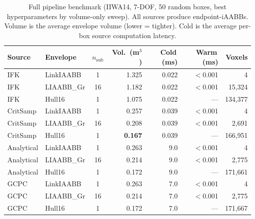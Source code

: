 \documentclass[journal]{IEEEtran}
\begin{document}
\begin{table}[t]
\centering
\caption{Full pipeline benchmark (IIWA14, 7-DOF, 50 random boxes,
best hyperparameters by volume-only sweep).
All sources produce endpoint-iAABBs.
Volume is the average envelope volume (lower = tighter).
Cold is the average per-box source computation latency.}
\label{tab:pipeline}
\setlength{\tabcolsep}{2.0pt}
\small
\begin{tabular}{@{}llcrrrr@{}}
\toprule
Source & Envelope & $n_\text{sub}$
  & \!\!Vol.\ (m$^3$)\!\! & \!Cold\,(ms)\! & \!Warm\,(ms)\! & Voxels \\
\midrule
IFK          & LinkIAABB   &  1 & 1.325 &   0.022 & $<$0.001 & 4 \\
IFK          & LIAABB\_Gr  & 16 & 1.182 &   0.022 &  $<$0.001 & 15{,}324 \\
IFK          & Hull16      &  1 & 1.075 &   0.022 &  --- & 134{,}377 \\
\midrule
CritSamp     & LinkIAABB   &  1 & 0.257 &   0.039 & $<$0.001 & 4 \\
CritSamp     & LIAABB\_Gr  & 16 & 0.208 &   0.039 &  $<$0.001 & 2{,}691 \\
CritSamp     & Hull16      &  1 & \textbf{0.167} &   0.039 &  --- & 166{,}951 \\
\midrule
Analytical   & LinkIAABB   &  1 & 0.263 &   9.0\phantom{00}  & $<$0.001 & 4 \\
Analytical   & LIAABB\_Gr  & 16 & 0.214 &   9.0\phantom{00}  &  $<$0.001 & 2{,}775 \\
Analytical   & Hull16      &  1 & 0.172 &   9.0\phantom{00}  &  --- & 171{,}661 \\
\midrule
GCPC         & LinkIAABB   &  1 & 0.263 &   7.0\phantom{00}  & $<$0.001 & 4 \\
GCPC         & LIAABB\_Gr  & 16 & 0.214 &   7.0\phantom{00}  &  $<$0.001 & 2{,}775 \\
GCPC         & Hull16      &  1 & 0.172 &   7.0\phantom{00}  &  --- & 171{,}667 \\
\bottomrule
\end{tabular}
\end{table}
\end{document}
